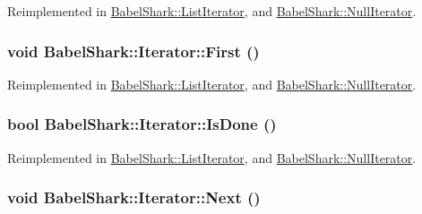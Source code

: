 Reimplemented in \hyperlink{class_babel_shark_1_1_list_iterator_2d1d087f5dc2154cde21b6e8a75d7ff1}{BabelShark::ListIterator}, and \hyperlink{class_babel_shark_1_1_null_iterator_938998731797e1bc1b465d6aeb4fc129}{BabelShark::NullIterator}.\hypertarget{class_babel_shark_1_1_iterator_84ac6a7e539a944a6f67590c8e882001}{
\subsubsection[{First}]{\setlength{\rightskip}{0pt plus 5cm}void BabelShark::Iterator::First ()}}
\label{class_babel_shark_1_1_iterator_84ac6a7e539a944a6f67590c8e882001}




Reimplemented in \hyperlink{class_babel_shark_1_1_list_iterator_87b086818286b6dd75934a8223a7adc4}{BabelShark::ListIterator}, and \hyperlink{class_babel_shark_1_1_null_iterator_fed04b8defc217356d99cee6bbcfd97f}{BabelShark::NullIterator}.\hypertarget{class_babel_shark_1_1_iterator_85852cf1ca186d86b07336c100d9834d}{
\subsubsection[{IsDone}]{\setlength{\rightskip}{0pt plus 5cm}bool BabelShark::Iterator::IsDone ()}}
\label{class_babel_shark_1_1_iterator_85852cf1ca186d86b07336c100d9834d}




Reimplemented in \hyperlink{class_babel_shark_1_1_list_iterator_44d4abc36f80db95a9e158af13688b2d}{BabelShark::ListIterator}, and \hyperlink{class_babel_shark_1_1_null_iterator_660ce1fb9a79f50269015e945d126baf}{BabelShark::NullIterator}.\hypertarget{class_babel_shark_1_1_iterator_5fb7aa35b296dfa34aa1203b6500f2e5}{
\subsubsection[{Next}]{\setlength{\rightskip}{0pt plus 5cm}void BabelShark::Iterator::Next ()}}
\label{class_babel_shark_1_1_iterator_5fb7aa35b296dfa34aa1203b6500f2e5}




